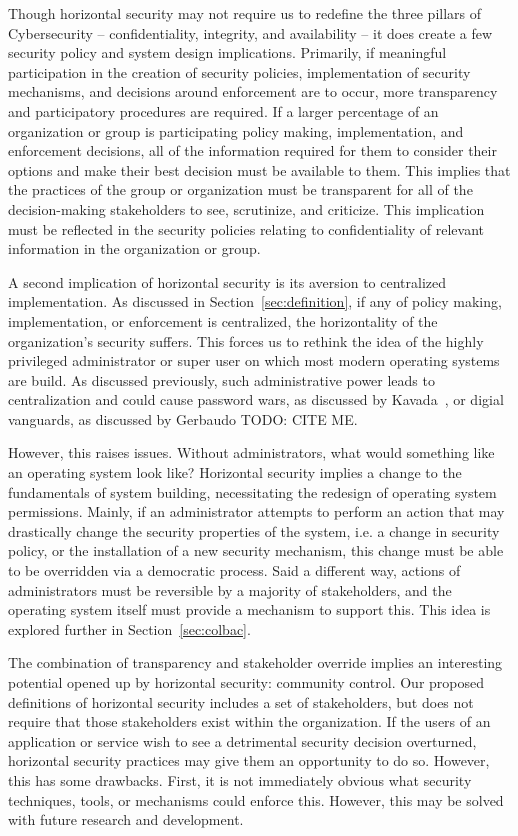 Though horizontal security may not require us to redefine the three pillars of
Cybersecurity -- confidentiality, integrity, and availability -- it does create
a few security policy and system design implications. Primarily, if meaningful
participation in the creation of security policies, implementation of security
mechanisms, and decisions around enforcement are to occur, more transparency and
participatory procedures are required. If a larger percentage of an organization
or group is participating policy making, implementation, and enforcement 
decisions, all of the information required for them to consider their options
and make their best decision must be available to them. This implies that the
practices of the group or organization must be transparent for all of the
decision-making stakeholders to see, scrutinize, and criticize. This implication
must be reflected in the security policies relating to confidentiality of
relevant information in the organization or group.

A second implication of horizontal security is its aversion to centralized
implementation. As discussed in Section~\ref{sec:definition}, if any of policy
making, implementation, or enforcement is centralized, the horizontality of the
organization's security suffers. This forces us to rethink the idea of the
highly privileged administrator or super user on which most modern operating
systems are build. As discussed previously, such administrative power leads to
centralization and could cause password wars, as discussed by 
Kavada~\cite{kavada2020counterpublics}, or digial vanguards, as discussed by 
Gerbaudo {\color{red} TODO: CITE ME}.

However, this raises issues. Without administrators, what would something like
an operating system look like? Horizontal security implies a change to the 
fundamentals of system building, necessitating the redesign of operating system
permissions. Mainly, if an administrator attempts to perform an action that may
drastically change the security properties of the system, i.e. a change in
security policy, or the installation of a new security mechanism, this change
must be able to be overridden via a democratic process. Said a different way,
actions of administrators must be reversible by a majority of stakeholders, and
the operating system itself must provide a mechanism to support this. This idea
is explored further in Section~\ref{sec:colbac}.

The combination of transparency and stakeholder override implies an interesting
potential opened up by horizontal security: community control. Our proposed
definitions of horizontal security includes a set of stakeholders, but does not
require that those stakeholders exist within the organization. If the users of
an application or service wish to see a detrimental security decision
overturned, horizontal security practices may give them an opportunity to do so.
However, this has some drawbacks. First, it is not immediately obvious what
security techniques, tools, or mechanisms could enforce this. However, this may
be solved with future research and development.


